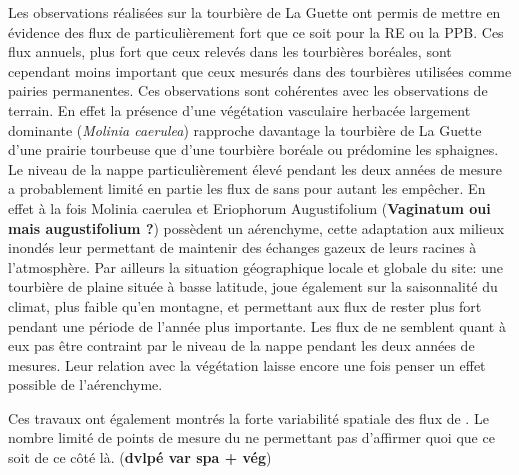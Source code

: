 Les observations réalisées sur la tourbière de La Guette ont permis de mettre en évidence des flux de \coo particulièrement fort que ce soit pour la RE ou la PPB.
Ces flux annuels, plus fort que ceux relevés dans les tourbières boréales, sont cependant moins important que ceux mesurés dans des tourbières utilisées comme pairies permanentes.
Ces observations sont cohérentes avec les observations de terrain.
En effet la présence d'une végétation vasculaire herbacée largement dominante (\textit{Molinia caerulea}) rapproche davantage la tourbière de La Guette d'une prairie tourbeuse que d'une tourbière boréale ou prédomine les sphaignes.
Le niveau de la nappe particulièrement élevé pendant les deux années de mesure a probablement limité en partie les flux de \coo sans pour autant les empêcher.
En effet à la fois Molinia caerulea et Eriophorum Augustifolium (\textbf{Vaginatum oui mais augustifolium ?}) possèdent un aérenchyme, cette adaptation aux milieux inondés leur permettant de maintenir des échanges gazeux de leurs racines à l'atmosphère.
Par ailleurs la situation géographique locale et globale du site: une tourbière de plaine située à basse latitude, joue également sur la saisonnalité du climat, plus faible qu'en montagne, et permettant aux flux de rester plus fort pendant une période de l'année plus importante.
Les flux de \chh ne semblent quant à eux pas être contraint par le niveau de la nappe pendant les deux années de mesures.
Leur relation avec la végétation laisse encore une fois penser un effet possible de l'aérenchyme.

Ces travaux ont également montrés la forte variabilité spatiale des flux de \coo.
Le nombre limité de points de mesure du \chh ne permettant pas d'affirmer quoi que ce soit de ce côté là.
(\textbf{dvlpé var spa + vég})



